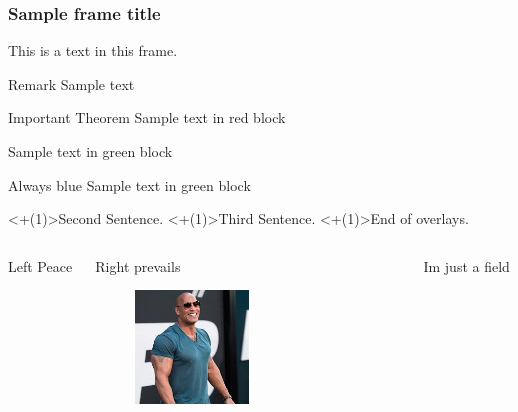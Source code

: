 \documentclass[17pt]{beamer}
\begin{document}
\begin{frame}
\frametitle{Sample frame title}
	This is a \alert{text} in this frame.
\begin{block}{Remark}
	Sample text
\end{block}
\begin{alertblock}{Important Theorem}
	Sample text in red block
\end{alertblock}
\begin{examples}
	Sample text in green  block
\end{examples}
\begin{block}{Always  blue}
	Sample text in green  block
\end{block}
\end{frame}
\begin{frame}
\onslide<+(1)>{Second Sentence.}
\onslide<+(1)>{Third Sentence.}
\onslide<+(1)>{End of overlays.}
\end{frame}
\begin{frame}
	\begin{columns}
		\begin{column}{.2\textwidth}
			\begin{block}{Left}
				Peace
			\end{block}
		\end{column}
	\begin{column}{.2\textwidth}
		\begin{block}{Right}
			prevails
		\end{block}
	\begin{figure}
	\centering
	\includegraphics[width=0.5\textwidth]{index.jpeg}	
	\end{figure}
	
	\end{column}
	\begin{column}{.2\textwidth}
	Im just a field
\end{column}
	\end{columns}
\end{frame}
\end{document}
